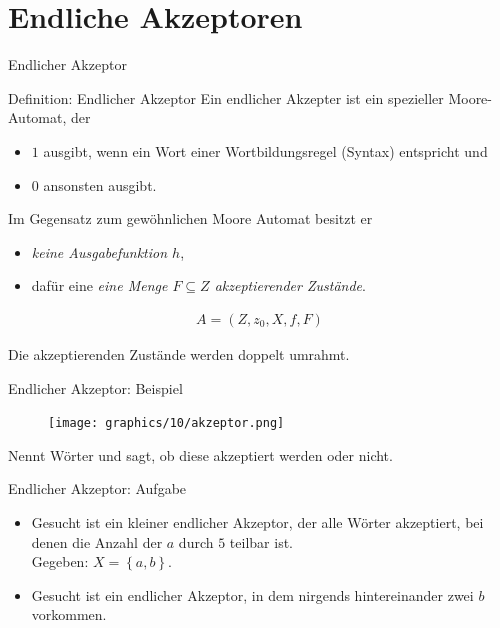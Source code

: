 \section{Endliche Akzeptoren}
\begin{frame}{Endlicher Akzeptor}
    \begin{block}{Definition: Endlicher Akzeptor}
        Ein endlicher Akzepter ist ein spezieller Moore-Automat, der 
        \begin{itemize}
            \item $1$ ausgibt, wenn ein Wort einer Wortbildungsregel (Syntax) entspricht und
            \item $0$ ansonsten ausgibt.
        \end{itemize}
        \pause
        Im Gegensatz zum gewöhnlichen Moore Automat besitzt er
        \begin{itemize}
            \item \emph{keine Ausgabefunktion $h$}, 
            \item dafür eine \emph{eine Menge $F \subseteq Z$ akzeptierender Zustände}.
        \end{itemize}
        \begin{align*}
            A = \left( Z, z_0, X, f, F \right)
        \end{align*}
    \end{block}
    Die akzeptierenden Zustände werden doppelt umrahmt.
\end{frame}
\begin{frame}{Endlicher Akzeptor: Beispiel}
    \begin{figure}[htbp]
        \centering
        \texttt{[image: graphics/10/akzeptor.png]}
    \end{figure}
    Nennt Wörter und sagt, ob diese akzeptiert werden oder nicht.
\end{frame}
\begin{frame}{Endlicher Akzeptor: Aufgabe}
    \begin{itemize}
        \item Gesucht ist ein kleiner endlicher Akzeptor, der alle Wörter akzeptiert, bei denen die Anzahl der $a$ durch $5$ teilbar ist.\\
            Gegeben: $X = \left\{ a,b \right\}$.
        \item Gesucht ist ein endlicher Akzeptor, in dem nirgends hintereinander zwei $b$ vorkommen.
    \end{itemize}
\end{frame}
